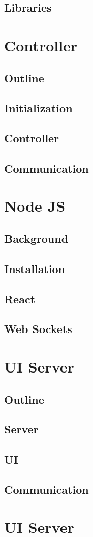 \documentclass{article}
\begin{document}
	\subsection{Libraries}

\section{Controller}
	\subsection{Outline}
	\subsection{Initialization}
	\subsection{Controller}
	\subsection{Communication}

\section{Node JS}
	\subsection{Background}
	\subsection{Installation}
	\subsection{React}
	\subsection{Web Sockets}
	
\section{UI Server}
	\subsection{Outline}
	\subsection{Server}
	\subsection{UI} 
	\subsection{Communication}
	
		
\section{UI Server}
\end{document}
